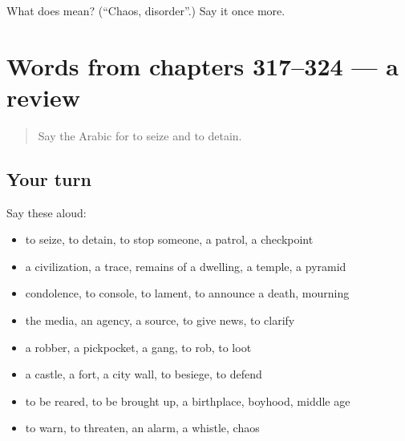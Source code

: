 \begin{tcolorbox}[breakable,colback=teal!4,colframe=teal!35!black,title={Before you move on}]
What does  mean? (\textquotedblleft{}Chaos, disorder\textquotedblright{}.) Say it once more.
\end{tcolorbox}
\section[(dialogue)]{Words from chapters 317–324 — a review}

\label{lesson:AR-R324-review-317-324}



\begin{quote}
Say the Arabic for to seize and to detain.
\end{quote}

\subsection*{Your turn}
Say these aloud:

\begin{itemize}
\raggedright
  \item to seize, to detain, to stop someone, a patrol, a checkpoint
  \item a civilization, a trace, remains of a dwelling, a temple, a pyramid
  \item condolence, to console, to lament, to announce a death, mourning
  \item the media, an agency, a source, to give news, to clarify
  \item a robber, a pickpocket, a gang, to rob, to loot
  \item a castle, a fort, a city wall, to besiege, to defend
  \item to be reared, to be brought up, a birthplace, boyhood, middle age
  \item to warn, to threaten, an alarm, a whistle, chaos
\end{itemize}

